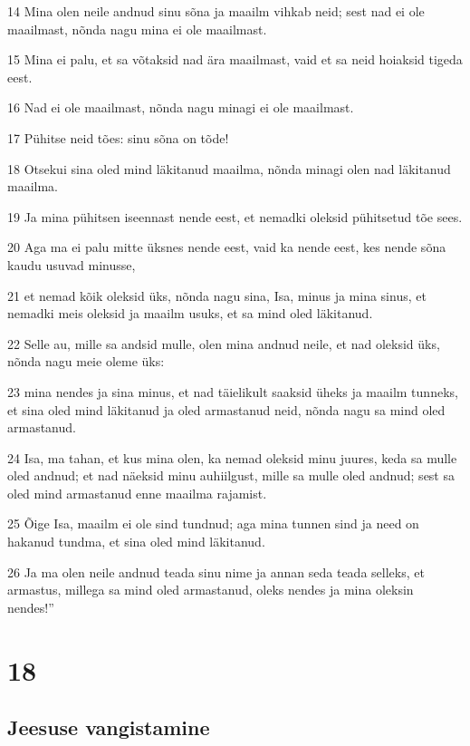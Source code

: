 \par 14 Mina olen neile andnud sinu sõna ja maailm vihkab neid; sest nad ei ole maailmast, nõnda nagu mina ei ole maailmast.
\par 15 Mina ei palu, et sa võtaksid nad ära maailmast, vaid et sa neid hoiaksid tigeda eest.
\par 16 Nad ei ole maailmast, nõnda nagu minagi ei ole maailmast.
\par 17 Pühitse neid tões: sinu sõna on tõde!
\par 18 Otsekui sina oled mind läkitanud maailma, nõnda minagi olen nad läkitanud maailma.
\par 19 Ja mina pühitsen iseennast nende eest, et nemadki oleksid pühitsetud tõe sees.
\par 20 Aga ma ei palu mitte üksnes nende eest, vaid ka nende eest, kes nende sõna kaudu usuvad minusse,
\par 21 et nemad kõik oleksid üks, nõnda nagu sina, Isa, minus ja mina sinus, et nemadki meis oleksid ja maailm usuks, et sa mind oled läkitanud.
\par 22 Selle au, mille sa andsid mulle, olen mina andnud neile, et nad oleksid üks, nõnda nagu meie oleme üks:
\par 23 mina nendes ja sina minus, et nad täielikult saaksid üheks ja maailm tunneks, et sina oled mind läkitanud ja oled armastanud neid, nõnda nagu sa mind oled armastanud.
\par 24 Isa, ma tahan, et kus mina olen, ka nemad oleksid minu juures, keda sa mulle oled andnud; et nad näeksid minu auhiilgust, mille sa mulle oled andnud; sest sa oled mind armastanud enne maailma rajamist.
\par 25 Õige Isa, maailm ei ole sind tundnud; aga mina tunnen sind ja need on hakanud tundma, et sina oled mind läkitanud.
\par 26 Ja ma olen neile andnud teada sinu nime ja annan seda teada selleks, et armastus, millega sa mind oled armastanud, oleks nendes ja mina oleksin nendes!”


\chapter{18}

\section*{Jeesuse vangistamine}

